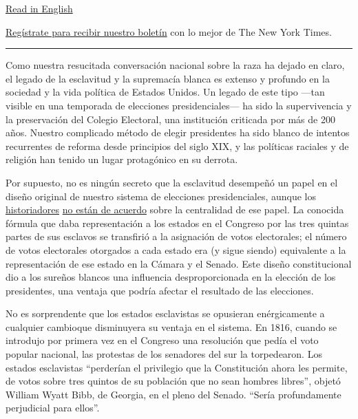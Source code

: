\href{https://www.nytimes.com/2020/08/03/opinion/electoral-college-racism-white-supremacy.html}{Read
in English}

\href{https://www.nytimes.com/newsletters/el-times}{Regístrate para
recibir nuestro boletín} con lo mejor de The New York Times.

\begin{center}\rule{0.5\linewidth}{\linethickness}\end{center}

Como nuestra resucitada conversación nacional sobre la raza ha dejado en
claro, el legado de la esclavitud y la supremacía blanca es extenso y
profundo en la sociedad y la vida política de Estados Unidos. Un legado
de este tipo ---tan visible en una temporada de elecciones
presidenciales--- ha sido la supervivencia y la preservación del Colegio
Electoral, una institución criticada por más de 200 años. Nuestro
complicado método de elegir presidentes ha sido blanco de intentos
recurrentes de reforma desde principios del siglo XIX, y las políticas
raciales y de religión han tenido un lugar protagónico en su derrota.

Por supuesto, no es ningún secreto que la esclavitud desempeñó un papel
en el diseño original de nuestro sistema de elecciones presidenciales,
aunque los
\href{https://www.nytimes.com/2019/04/04/opinion/the-electoral-college-slavery-myth.html?action=click\&module=RelatedLinks\&pgtype=Article}{historiadores}
\href{https://www.nytimes.com/2019/04/06/opinion/electoral-college-slavery.html}{no
están de acuerdo} sobre la centralidad de ese papel. La conocida fórmula
que daba representación a los estados en el Congreso por las tres
quintas partes de sus esclavos se transfirió a la asignación de votos
electorales; el número de votos electorales otorgados a cada estado era
(y sigue siendo) equivalente a la representación de ese estado en la
Cámara y el Senado. Este diseño constitucional dio a los sureños blancos
una influencia desproporcionada en la elección de los presidentes, una
ventaja que podría afectar el resultado de las elecciones.

No es sorprendente que los estados esclavistas se opusieran
enérgicamente a cualquier cambioque disminuyera su ventaja en el
sistema. En 1816, cuando se introdujo por primera vez en el Congreso una
resolución que pedía el voto popular nacional, las protestas de los
senadores del sur la torpedearon. Los estados esclavistas ``perderían el
privilegio que la Constitución ahora les permite, de votos sobre tres
quintos de su población que no sean hombres libres'', objetó William
Wyatt Bibb, de Georgia, en el pleno del Senado. ``Sería profundamente
perjudicial para ellos''.

